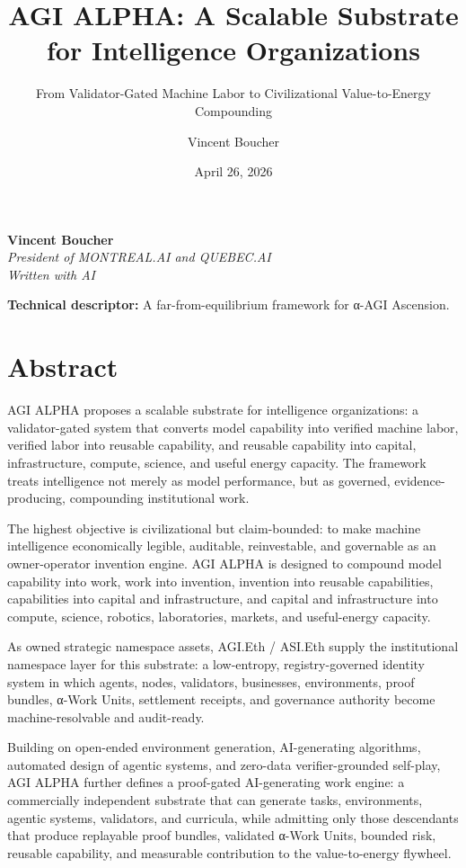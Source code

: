 \documentclass[
  11pt,
]{article}
\title{AGI ALPHA: A Scalable Substrate for Intelligence Organizations}
\subtitle{From Validator-Gated Machine Labor to Civilizational
Value-to-Energy Compounding}
\author{Vincent Boucher}
\date{April 26, 2026}
\begin{document}
\maketitle

\textbf{Vincent Boucher}\\
\emph{President of MONTREAL.AI and QUEBEC.AI}\\
\emph{Written with AI}

\textbf{Technical descriptor:} A far-from-equilibrium framework for
α-AGI Ascension.

\section{Abstract}\label{abstract}

AGI ALPHA proposes a scalable substrate for intelligence organizations:
a validator-gated system that converts model capability into verified
machine labor, verified labor into reusable capability, and reusable
capability into capital, infrastructure, compute, science, and useful
energy capacity. The framework treats intelligence not merely as model
performance, but as governed, evidence-producing, compounding
institutional work.

The highest objective is civilizational but claim-bounded: to make
machine intelligence economically legible, auditable, reinvestable, and
governable as an owner-operator invention engine. AGI ALPHA is designed
to compound model capability into work, work into invention, invention
into reusable capabilities, capabilities into capital and
infrastructure, and capital and infrastructure into compute, science,
robotics, laboratories, markets, and useful-energy capacity.

As owned strategic namespace assets, AGI.Eth / ASI.Eth supply the
institutional namespace layer for this substrate: a low-entropy,
registry-governed identity system in which agents, nodes, validators,
businesses, environments, proof bundles, α-Work Units, settlement
receipts, and governance authority become machine-resolvable and
audit-ready.

Building on open-ended environment generation, AI-generating algorithms,
automated design of agentic systems, and zero-data verifier-grounded
self-play, AGI ALPHA further defines a proof-gated AI-generating work
engine: a commercially independent substrate that can generate tasks,
environments, agentic systems, validators, and curricula, while
admitting only those descendants that produce replayable proof bundles,
validated α-Work Units, bounded risk, reusable capability, and
measurable contribution to the value-to-energy flywheel.
\end{document}
